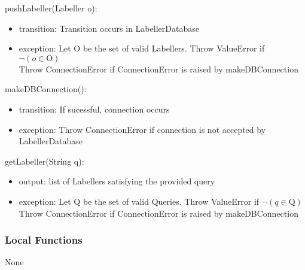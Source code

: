 \documentclass[12pt, titlepage]{article}
\begin{document}
  \noindent pushLabeller(Labeller o):
  \begin{itemize}
  \item transition: Transition occurs in LabellerDatabase
  \item exception: Let O be the set of valid Labellers. Throw ValueError if $\neg (o \in \text{O})$\\
  Throw ConnectionError if ConnectionError is raised by makeDBConnection
  \end{itemize}

  \noindent makeDBConnection():
  \begin{itemize}
  \item transition: If sucessful, connection occurs
  \item exception: Throw ConnectionError if connection is not accepted by LabellerDatabase
  \end{itemize}

  \noindent getLabeller(String q):
  \begin{itemize}
  \item output: list of Labellers satisfying the provided query
  \item exception: Let Q be the set of valid Queries. Throw ValueError if $\neg (q \in \text{Q})$\\
  Throw ConnectionError if ConnectionError is raised by makeDBConnection

  \end{itemize}
  
  
  
  \subsubsection{Local Functions}

  None
  

\newpage
\end{document}
